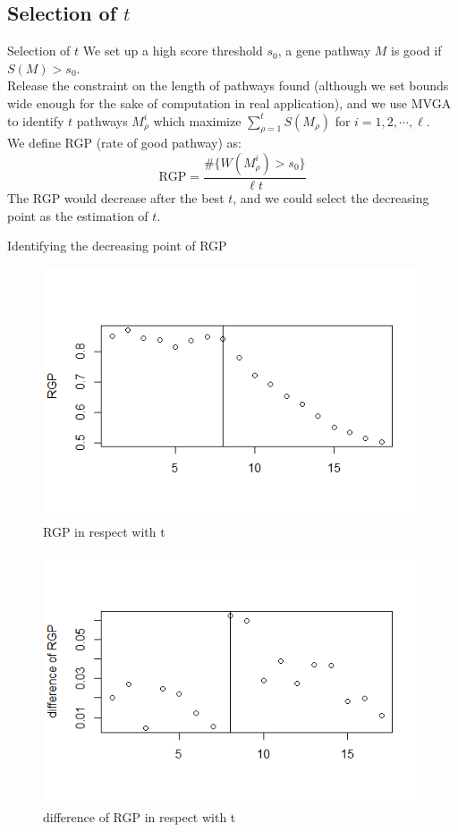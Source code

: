 \documentclass[xcolor=dvipsnames]{beamer}
\begin{document}
\subsection{Selection of $t$}
\begin{frame}{Selection of $t$}
We set up a high score threshold $s_0$, a gene pathway $M$ is good if $S(M)>s_0$.\\
Release the constraint on the length of pathways found (although we set bounds wide enough for the sake of computation in real application), and we use MVGA to identify $t$ pathways $M_{\rho}^i$ which maximize $\sum_{\rho=1}^{t}S(M_{\rho})$ for $i=1,2,\cdots,\ell$.\\
We define RGP (rate of good pathway) as:
\[
\text{RGP}=\frac{\#\{W(M_{\rho}^i)>s_0\}}{\ell t}
\]
The RGP would decrease after the best $t$, and we could select the decreasing point as the estimation of $t$.\\
\end{frame}
\begin{frame}{Identifying the decreasing point of RGP}
\begin{figure}
\centering
\includegraphics[width=0.9\linewidth]{RGP.png}
\caption{RGP in respect with t}
\end{figure}
\end{frame}
\begin{frame}
\begin{figure}
\centering
\includegraphics[width=0.9\linewidth]{diff.png}
\caption{difference of RGP in respect with t}
\end{figure}
\end{frame}
\end{document}
